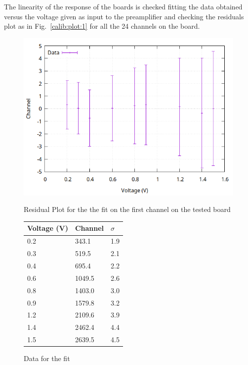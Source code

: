 \bigbreak

The linearity of the response of the boards is checked fitting the data obtained versus the voltage given as input to the preamplifier and checking the residuals plot as in Fig.~\ref{calib:plot:1} for all the 24 channels on the board.

\bigbreak

\begin{figure}[th]
  \centering
  \begin{minipage}[b]{0.45\textwidth}
    \includegraphics[width=\textwidth]{img/fourth_board_line/data_1/calib_0.png}
    \caption{Residual Plot for the the fit on the first channel on the tested board}
    \label{calib:plot:1}
  \end{minipage}
  \hfill
  \begin{minipage}[b]{0.45\textwidth}
  \begin{tabular}{lll}
    Voltage (V) & Channel & $\sigma$ \\
    \midrule
    0.2 & \num{343.1} & 1.9 \\
    0.3 & \num{519.5} & 2.1 \\
    0.4 & \num{695.4} & 2.2 \\
    0.6 & \num{1049.5} & 2.6 \\
    0.8 & \num{1403.0} & 3.0 \\
    0.9 & \num{1579.8} & 3.2 \\
    1.2 & \num{2109.6} & 3.9 \\
    1.4 & \num{2462.4} & 4.4 \\
    1.5 & \num{2639.5} & 4.5 \\
    \bottomrule
  \end{tabular}
  \caption{Data for the fit}
  \label{calib:1}
  \end{minipage}
\end{figure}

